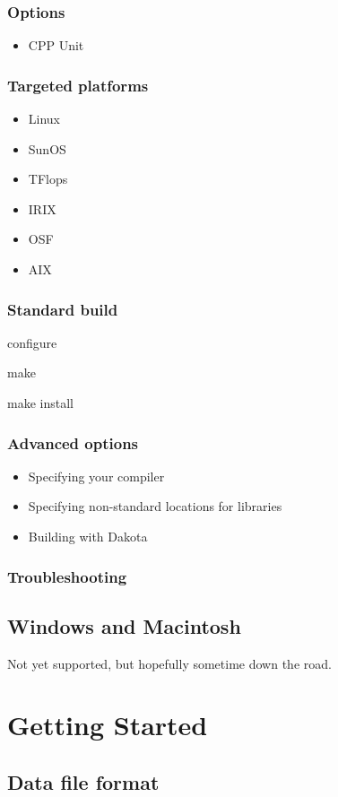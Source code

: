 \documentclass{article}
\begin{document}
\subsubsection{Options}
\begin{itemize}
\item CPP Unit
\end{itemize}
\subsubsection{Targeted platforms}
\begin{itemize}
\item Linux
\item SunOS
\item TFlops 
\item IRIX
\item OSF
\item AIX 
\end{itemize}
\subsubsection{Standard build}
configure

make

make install

\subsubsection{Advanced options}
\begin{itemize}
\item Specifying your compiler 
\item Specifying non-standard locations for libraries
\item Building with Dakota 
\end{itemize}

\subsubsection{Troubleshooting}
\subsection{Windows and Macintosh}
Not yet supported, but hopefully sometime down the road.

\section{Getting Started}
\subsection{Data file format}\label{sec:format}
\end{document}
